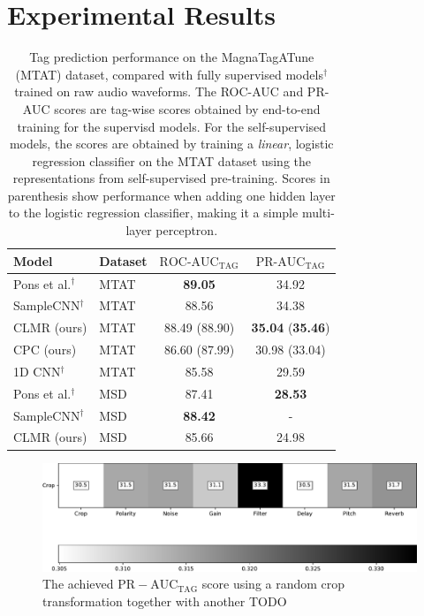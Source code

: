\chapter{Experimental Results}\label{sec:results}
\begin{table}
    \centering
    \begin{tabular}{@{}llcc@{}}\toprule
        Model & Dataset & $\text{ROC-AUC}_\text{TAG}$ & $\text{PR-AUC}_\text{TAG}$ \\ \midrule
        Pons et al.$^\dagger$ & MTAT & \textbf{89.05} & 34.92 \\
        SampleCNN$^\dagger$ & MTAT & 88.56 & 34.38 \\
        CLMR (ours) & MTAT & 88.49 (88.90) & \textbf{35.04} (\textbf{35.46}) \\
        CPC (ours) & MTAT & 86.60 (87.99) & 30.98 (33.04) \\
        1D CNN$^\dagger$ & MTAT & 85.58 & 29.59 \\\midrule
        Pons et al.$^\dagger$ & MSD & 87.41 & \textbf{28.53} \\
        SampleCNN$^\dagger$ & MSD & \textbf{88.42} & - \\
        CLMR (ours) & MSD & 85.66 & 24.98 \\
        \bottomrule
    \end{tabular}
    \caption{Tag prediction performance on the MagnaTagATune (MTAT) dataset, compared with fully supervised models$^\dagger$ trained on raw audio waveforms.
The ROC-AUC and PR-AUC scores are tag-wise scores obtained by end-to-end training for the supervisd models.
For the self-supervised models, the scores are obtained by training a \emph{linear}, logistic regression classifier on the MTAT dataset using the representations from self-supervised pre-training.
Scores in parenthesis show performance when adding one hidden layer to the logistic regression classifier, making it a simple multi-layer perceptron.}
    \label{tab:magnatagatune_results}
\end{table}

\begin{figure}[t]
    \centering
    \includegraphics[width=\columnwidth]{figs/transformation_study.pdf}
    \caption{The achieved $\mathrm{PR-AUC}_{\mathrm{TAG}}$ score using a random crop transformation together with another TODO}
    \label{fig:transformation_study}
\end{figure}

